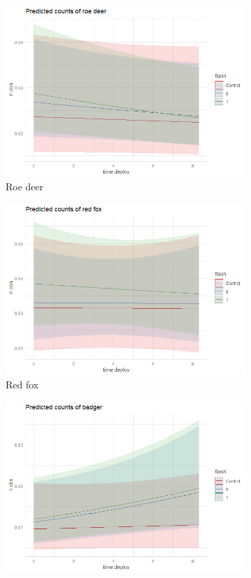 

\begin{figure}
		\begin{subfigure}{.5\textwidth}
		  \centering
		  	\includegraphics[width=.8\linewidth]{../R/glmm_sp_files/figure-gfm/raadyr-C-report-1.png}
		  \caption{Roe deer}
		  	\label{fig:glmm_raa}
	\end{subfigure}
		\begin{subfigure}{.5\textwidth}
		  \centering
		  	\includegraphics[width=.8\linewidth]{../R/glmm_sp_files/figure-gfm/rev-report-1.png}
		  \caption{Red fox}
		  	\label{fig:glmm_rev}
	\end{subfigure}
		\begin{subfigure}{.5\textwidth}
		  \centering
		  	\includegraphics[width=.8\linewidth]{../R/glmm_sp_files/figure-gfm/grevling-report-1.png}

\end{subfigure}
\end{figure}

